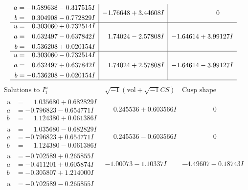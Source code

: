 \documentclass[1p]{elsarticle_modified}
\theoremstyle{definition}
\newcommand{\I}{\sqrt{-1}}
\begin{document}
$$\begin{array}{c|c|c}
\begin{aligned}
a &= -0.589638 - 0.317515 I \\
b &= \phantom{-}0.304908 - 0.772829 I\end{aligned}
 & -1.76648 + 3.44608 I & \phantom{-0.000000 } 0 \\ \hline\begin{aligned}
u &= \phantom{-}0.303060 + 0.732514 I \\
a &= \phantom{-}0.632497 - 0.637842 I \\
b &= -0.536208 + 0.020154 I\end{aligned}
 & \phantom{-}1.74024 - 2.57808 I & -1.64614 + 3.99127 I \\ \hline\begin{aligned}
u &= \phantom{-}0.303060 - 0.732514 I \\
a &= \phantom{-}0.632497 + 0.637842 I \\
b &= -0.536208 - 0.020154 I\end{aligned}
 & \phantom{-}1.74024 + 2.57808 I & -1.64614 - 3.99127 I\\
 \hline 
 \end{array}$$\newpage$$\begin{array}{c|c|c}  
\text{Solutions to }I^u_{1}& \I (\text{vol} + \sqrt{-1}CS) & \text{Cusp shape}\\
 \hline 
\begin{aligned}
u &= \phantom{-}1.035680 + 0.682829 I \\
a &= -0.796823 - 0.654771 I \\
b &= \phantom{-}1.124380 + 0.061386 I\end{aligned}
 & \phantom{-}0.245536 + 0.603566 I & \phantom{-0.000000 } 0 \\ \hline\begin{aligned}
u &= \phantom{-}1.035680 - 0.682829 I \\
a &= -0.796823 + 0.654771 I \\
b &= \phantom{-}1.124380 - 0.061386 I\end{aligned}
 & \phantom{-}0.245536 - 0.603566 I & \phantom{-0.000000 } 0 \\ \hline\begin{aligned}
u &= -0.702589 + 0.265855 I \\
a &= -0.411201 + 0.605874 I \\
b &= -0.305807 + 1.214000 I\end{aligned}
 & -1.00073 - 1.10337 I & -4.49607 - 0.18743 I \\ \hline\begin{aligned}
u &= -0.702589 - 0.265855 I \\

\end{aligned}
\end{array}$$
\end{document}
